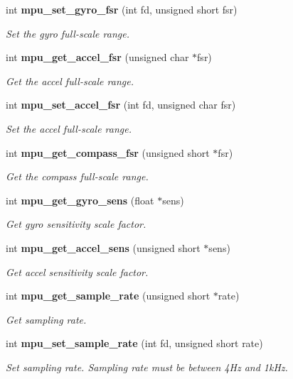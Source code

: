 \begin{DoxyCompactItemize}
int \textbf{ mpu\+\_\+set\+\_\+gyro\+\_\+fsr} (int fd, unsigned short fsr)
\begin{DoxyCompactList}\small\item\em Set the gyro full-\/scale range. \end{DoxyCompactList}\item 
int \textbf{ mpu\+\_\+get\+\_\+accel\+\_\+fsr} (unsigned char $\ast$fsr)
\begin{DoxyCompactList}\small\item\em Get the accel full-\/scale range. \end{DoxyCompactList}\item 
int \textbf{ mpu\+\_\+set\+\_\+accel\+\_\+fsr} (int fd, unsigned char fsr)
\begin{DoxyCompactList}\small\item\em Set the accel full-\/scale range. \end{DoxyCompactList}\item 
int \textbf{ mpu\+\_\+get\+\_\+compass\+\_\+fsr} (unsigned short $\ast$fsr)
\begin{DoxyCompactList}\small\item\em Get the compass full-\/scale range. \end{DoxyCompactList}\item 
int \textbf{ mpu\+\_\+get\+\_\+gyro\+\_\+sens} (float $\ast$sens)
\begin{DoxyCompactList}\small\item\em Get gyro sensitivity scale factor. \end{DoxyCompactList}\item 
int \textbf{ mpu\+\_\+get\+\_\+accel\+\_\+sens} (unsigned short $\ast$sens)
\begin{DoxyCompactList}\small\item\em Get accel sensitivity scale factor. \end{DoxyCompactList}\item 
int \textbf{ mpu\+\_\+get\+\_\+sample\+\_\+rate} (unsigned short $\ast$rate)
\begin{DoxyCompactList}\small\item\em Get sampling rate. \end{DoxyCompactList}\item 
int \textbf{ mpu\+\_\+set\+\_\+sample\+\_\+rate} (int fd, unsigned short rate)
\begin{DoxyCompactList}\small\item\em Set sampling rate. Sampling rate must be between 4\+Hz and 1k\+Hz. \end{DoxyCompactList}\item 

\end{DoxyCompactItemize}
